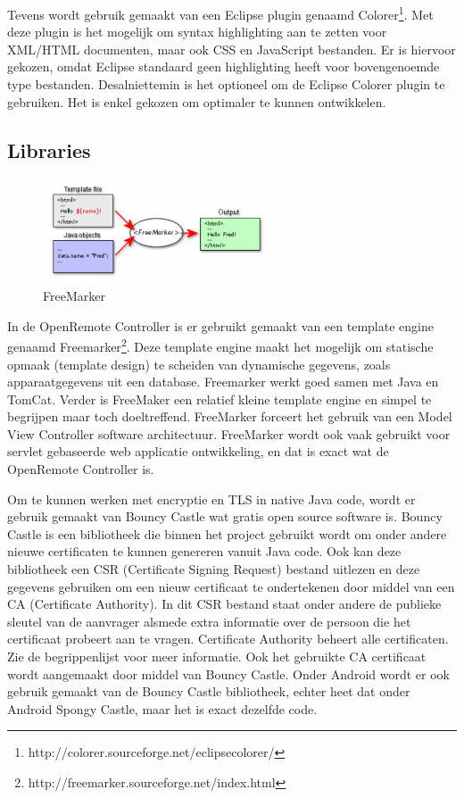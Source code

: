 \documentclass[]{article}
\begin{document}
Tevens wordt gebruik gemaakt van een Eclipse plugin genaamd
Colorer\footnote{http://colorer.sourceforge.net/eclipsecolorer/}.
Met deze plugin is het mogelijk om syntax highlighting aan te zetten voor
XML/HTML documenten, maar ook CSS en JavaScript bestanden. Er is hiervoor
gekozen, omdat Eclipse standaard geen highlighting heeft voor bovengenoemde
type bestanden. Desalniettemin is het optioneel om de Eclipse Colorer
plugin te gebruiken. Het is enkel gekozen om optimaler te kunnen ontwikkelen.

\newpage
\subsection{Libraries}
\begin{figure}[htpb]
   \begin{center}
     \includegraphics[width=0.6\textwidth]{freemarker.pdf}
   \end{center}
   \caption{FreeMarker}
\end{figure}

In de OpenRemote Controller is er gebruikt gemaakt van een template engine
genaamd Freemarker\footnote{http://freemarker.sourceforge.net/index.html}. Deze template engine maakt het mogelijk om statische
opmaak (template design) te scheiden van dynamische gegevens, zoals apparaatgegevens
uit een database. Freemarker werkt goed samen met Java en TomCat.
Verder is FreeMaker een relatief kleine template engine en simpel te
begrijpen maar toch doeltreffend. FreeMarker forceert het gebruik
van een Model View Controller software architectuur. FreeMarker wordt ook
vaak gebruikt voor servlet gebaseerde web applicatie ontwikkeling, en dat is
exact wat de OpenRemote Controller is.

Om te kunnen werken met encryptie en TLS in native Java code, wordt er gebruik
gemaakt van Bouncy Castle wat gratis open source software is.  Bouncy Castle is
een bibliotheek die binnen het project gebruikt wordt om onder andere nieuwe
certificaten te kunnen genereren vanuit Java code. Ook kan deze bibliotheek een
CSR (Certificate Signing Request) bestand uitlezen en deze gegevens 
gebruiken om een nieuw certificaat te ondertekenen door middel van een CA
(Certificate Authority). In dit CSR bestand staat onder andere de publieke
sleutel van de aanvrager alsmede extra informatie over de persoon die het
certificaat probeert aan te vragen.  Certificate Authority beheert alle
certificaten. Zie de begrippenlijst voor meer informatie. Ook het gebruikte CA
certificaat wordt aangemaakt door middel van Bouncy Castle. Onder Android wordt
er ook gebruik gemaakt van de Bouncy Castle bibliotheek, echter heet dat onder
Android Spongy Castle, maar het is exact dezelfde code.
\end{document}
